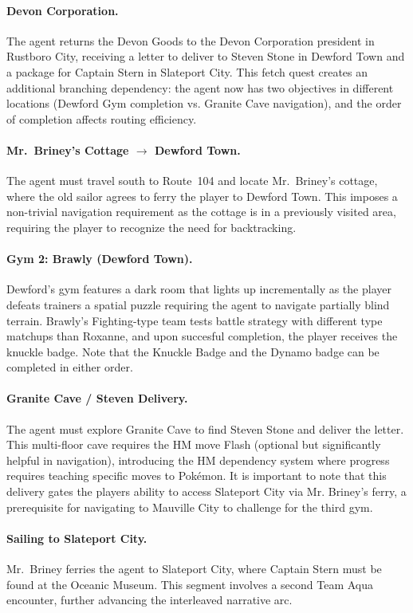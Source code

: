 \paragraph{Devon Corporation.} The agent returns the Devon Goods to the Devon Corporation president in Rustboro City, receiving a letter to deliver to Steven Stone in Dewford Town and a package for Captain Stern in Slateport City. This fetch quest creates an additional branching dependency: the agent now has two objectives in different locations (Dewford Gym completion vs. Granite Cave navigation), and the order of completion affects routing efficiency.

\paragraph{Mr.\ Briney's Cottage $\to$ Dewford Town.} The agent must travel south to Route~104 and locate Mr.\ Briney's cottage, where the old sailor agrees to ferry the player to Dewford Town. This imposes a non-trivial navigation requirement as the cottage is in a previously visited area, requiring the player to recognize the need for backtracking.

\paragraph{Gym 2: Brawly (Dewford Town).} Dewford's gym features a dark room that lights up incrementally as the player defeats trainers a spatial puzzle requiring the agent to navigate partially blind terrain. Brawly's Fighting-type team tests battle strategy with different type matchups than Roxanne, and upon succesful completion, the player receives the knuckle badge. Note that the Knuckle Badge and the Dynamo badge can be completed in either order.

\paragraph{Granite Cave / Steven Delivery.} The agent must explore Granite Cave to find Steven Stone and deliver the letter. This multi-floor cave requires the HM move Flash (optional but significantly helpful in navigation), introducing the HM dependency system where progress requires teaching specific moves to Pok\'{e}mon. It is important to note that this delivery gates the players ability to access Slateport City via Mr. Briney's ferry, a prerequisite for navigating to Mauville City to challenge for the third gym. 

\paragraph{Sailing to Slateport City.} Mr.\ Briney ferries the agent to Slateport City, where Captain Stern must be found at the Oceanic Museum. This segment involves a second Team Aqua encounter, further advancing the interleaved narrative arc.

